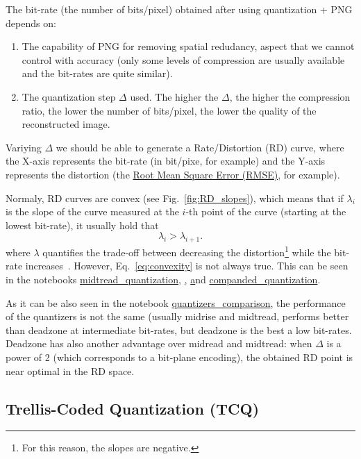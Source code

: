 The bit-rate (the number of bits/pixel) obtained after using
quantization + PNG depends on:
\begin{enumerate}
\item The capability of PNG for removing spatial redudancy, aspect
  that we cannot control with accuracy (only some levels of
  compression are usually available and the bit-rates are quite
  similar).
\item The quantization step $\Delta$ used. The higher the $\Delta$,
  the higher the compression ratio, the lower the number of
  bits/pixel, the lower the quality of the reconstructed image.
\end{enumerate}
Variying $\Delta$ we should be able to generate a Rate/Distortion (RD)
curve, where the X-axis represents the bit-rate (in bit/pixe, for
example) and the Y-axis represents the distortion (the
\href{https://en.wikipedia.org/wiki/Root-mean-square_deviation}{Root
  Mean Square Error (RMSE)}, for example).

Normaly, RD curves are convex (see Fig.~\ref{fig:RD_slopes}), which
means that if $\lambda_i$ is the slope of the curve measured at the
$i$-th point of the curve (starting at the lowest bit-rate), it
usually hold that
\begin{equation}
  \lambda_i > \lambda_{i+1}.
  \label{eq:convexity}
\end{equation}
where $\lambda$ quantifies the trade-off between decreasing the
distortion\footnote{For this reason, the slopes are negative.} while
the bit-rate
increases~\cite{vetterli1995wavelets,sayood2017introduction}. However,
Eq.~\ref{eq:convexity} is not always true. This can be seen in the
notebooks \href{}{midtread\_quantization},
\href{midrise\_quantization}, \href{deadzone\_quantization} and
\href{}{companded\_quantization}.

As it can be also seen in the notebook
\href{}{quantizers\_comparison}, the performance of the quantizers is
not the same (usually midrise and midtread, performs better than
deadzone at intermediate bit-rates, but deadzone is the best a low
bit-rates. Deadzone has also another advantage over midread and
midtread: when $\Delta$ is a power of 2 (which corresponds to a
bit-plane encoding), the obtained RD point is near optimal in the RD
space.


\subsection{Trellis-Coded Quantization (TCQ)}

